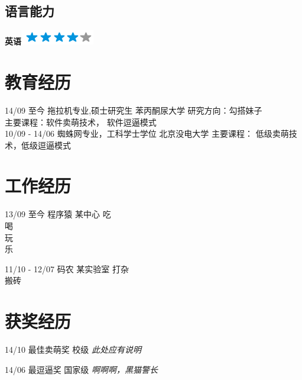 \documentclass[]{friggeri-cv}
\begin{document}
\begin{aside}
  \section{语言能力}
    \textbf{英语}\includegraphics[scale=0.40]{img/4stars.png}
    ~
\end{aside}

\section{教育经历}
\begin{entrylist}
  \entry
    {14/09 至今}
    {拖拉机专业,硕士研究生}
    {苯丙酮尿大学}
    {研究方向：勾搭妹子\\
    主要课程：软件卖萌技术， 软件逗逼模式\\
    }
  \entry
    {10/09 - 14/06}
    {蜘蛛网专业，工科学士学位}
    {北京没电大学}
    {
    主要课程： 低级卖萌技术，低级逗逼模式
    }
\end{entrylist}

\section{工作经历}
\begin{entrylist}
  \entry
    {13/09 至今 }
    {程序猿}
    {某中心}
    {吃\\
    喝\\
    玩\\
    乐\\}

  \entry
    {11/10 - 12/07}
    {码农}
    {某实验室}
    {打杂\\
    搬砖}
\end{entrylist}


\section{获奖经历}
\begin{entrylist}
  \entry
    {14/10}
    {最佳卖萌奖}
    {校级}
    {\emph{此处应有说明}\\}

  \entry
    {14/06}
    {最逗逼奖}
    {国家级}
    {\emph{啊啊啊，黑猫警长
    }}
\end{entrylist}


\newpage
\end{document}
